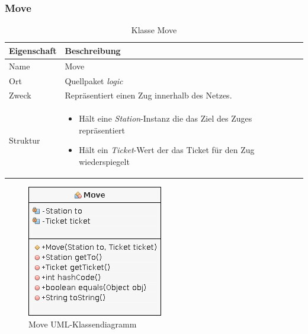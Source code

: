     \subsubsection{Move}
        \begin{table}[H]
            \caption{Klasse Move}
            \begin{tabular}{p{2.5cm}  p{9.5cm}} 
                \hline
                \textbf{Eigenschaft} & \textbf{Beschreibung}\\
                \hline
                Name & Move\\
                Ort & Quellpaket \textit{logic}\\
                \hline
                Zweck &
                Repräsentiert einen Zug innerhalb des Netzes.
                \\
                \hline
                Struktur &
                \begin{itemize}
                    \itemsep0em
                    \item Hält eine \textit{Station}-Instanz die das Ziel des Zuges repräsentiert
                    \item Hält ein \textit{Ticket}-Wert der das Ticket für den Zug wiederspiegelt
                \end{itemize}
                \\
                \hline
            \end{tabular}
        \end{table}
        \begin{figure}[H]
            \centering
            \includegraphics[scale=0.7]{img/uml/move.png}   
            \caption{Move UML-Klassendiagramm}
        \end{figure}


